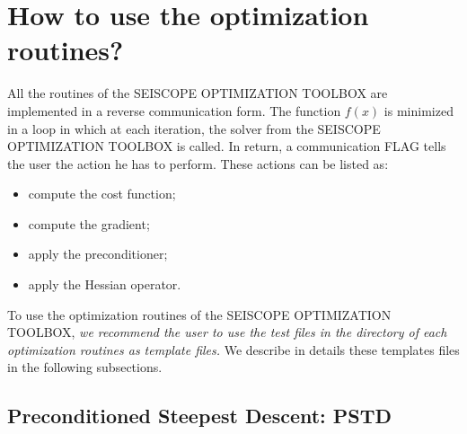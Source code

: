\documentclass[a4paper,twoside,final,onecolumn,11pt,openright]{article}
\begin{document}
\newpage 
\section{How to use the optimization routines?}

All the routines of the SEISCOPE OPTIMIZATION TOOLBOX are implemented in a reverse communication form. The function $f(x)$ is minimized in a loop in which at each iteration, the solver from the SEISCOPE OPTIMIZATION TOOLBOX is called. In return, a communication FLAG tells the user the action he has to perform. These actions can be listed as: 
\begin{itemize}
 \item compute the cost function;  
 \item compute the gradient;
 \item apply the preconditioner; 
 \item apply the Hessian operator.
\end{itemize}


To use the optimization routines of the SEISCOPE OPTIMIZATION TOOLBOX, \textit{we recommend the user to use the test files in the directory of each optimization routines as template files.} We describe in details these templates files in the following subsections.  

\subsection{Preconditioned Steepest Descent: PSTD}
\end{document}
